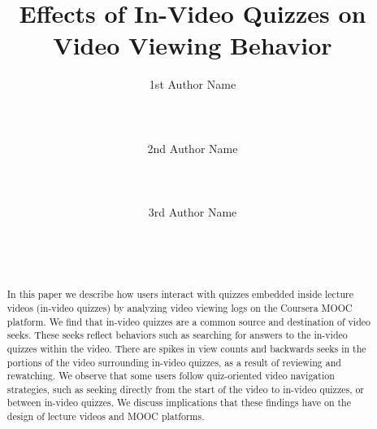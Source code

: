 \documentclass{sigchi}
\begin{document}
\title{Effects of In-Video Quizzes on Video Viewing Behavior}

\author{
  \alignauthor 1st Author Name\\
    \\
    \\
    \\
  \alignauthor 2nd Author Name\\
    \\
    \\
    \\
  \alignauthor 3rd Author Name\\
    \\
    \\
    \\
}

\maketitle

\begin{abstract}
In this paper we describe how users interact with quizzes embedded inside lecture videos (in-video quizzes) by analyzing video viewing logs on the Coursera MOOC platform. We find that in-video quizzes are a common source and destination of video seeks. These seeks reflect behaviors such as searching for answers to the in-video quizzes within the video. There are spikes in view counts and backwards seeks in the portions of the video surrounding in-video quizzes, as a result of reviewing and rewatching. We observe that some users follow quiz-oriented video navigation strategies, such as seeking directly from the start of the video to in-video quizzes, or between in-video quizzes. We discuss implications that these findings have on the design of lecture videos and MOOC platforms. %
\end{abstract}
\end{document}
